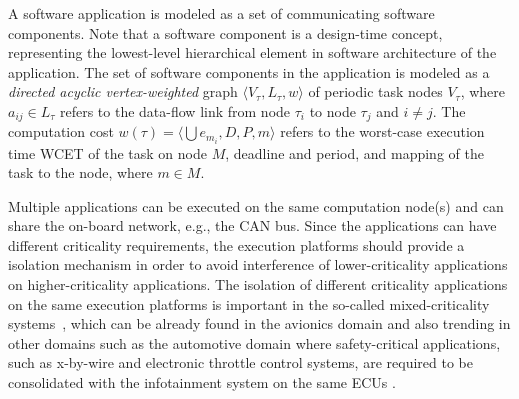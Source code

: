 \begin{definition}
A software application is modeled as a set of communicating software components. Note that a software component is a design-time concept, representing the lowest-level hierarchical element in software architecture of the application. The set of software components in the application is modeled as a \textit{directed acyclic vertex-weighted} graph $\langle V_\tau,L_\tau, w\rangle$ of periodic task nodes  $V_\tau$, where $a_{ij}\in L_\tau$ refers to the data-flow link from node $\tau_i$ to node $\tau_j$ and $i \neq j$. The computation cost $w(\tau)=\langle \bigcup e_{m_i},D,P, m\rangle$ refers to the worst-case execution time {WCET} of the task on node $M$, deadline and period, and mapping of the task to the node, where $m\in M$.
\end{definition}%

Multiple applications can be executed on the same computation node(s) and can share the on-board network, e.g., the CAN bus. Since the applications can have different criticality requirements, the execution platforms should provide a isolation mechanism in order to avoid interference of lower-criticality applications on higher-criticality applications. The isolation of different criticality applications on the same execution platforms is important in the so-called mixed-criticality systems~\cite{Vestal2007PreemptiveAssurance}, which can be already found in the avionics domain and also trending in other domains such as the automotive domain where safety-critical applications, such as x-by-wire and electronic throttle control systems, are required to be consolidated with the infotainment system on the same ECUs \cite{bibid}.

